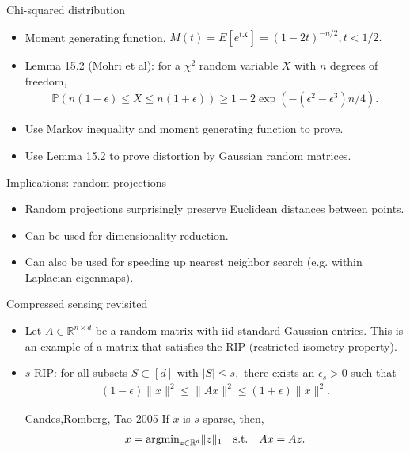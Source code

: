 \documentclass[final]{beamer}
\begin{document}
\begin{frame}{Chi-squared distribution}
	\begin{itemize}
		\item Moment generating function, $M(t) = E[e^{tX}] = (1-2t)^{-n/2}, t < 1/2.$
		\pause
	\item Lemma 15.2 (Mohri et al): for a $\chi^2$ random variable $X$ with $n$ degrees of freedom, 
	\begin{align}
		\mathbb{P}(n(1 - \epsilon)\leq X \leq n(1+\epsilon)) \geq 1 - 2\exp(-(\epsilon^2 - \epsilon^3) n/4).
	\end{align}
	\pause
\item Use Markov inequality and moment generating function to prove.
	\pause
	\item Use Lemma 15.2 to prove distortion by Gaussian random matrices.
	\end{itemize}
\end{frame}
\begin{frame}{Implications: random projections}
	\begin{itemize}
		\item Random projections surprisingly preserve Euclidean distances between points.
		\pause 
		\item Can be used for dimensionality reduction.
		\pause
		\item Can also be used for speeding up nearest neighbor search (e.g. within Laplacian eigenmaps).
		\pause
		
			
	\end{itemize}
\end{frame}
\begin{frame}{Compressed sensing revisited}
	\begin{itemize}
	\item Let $A \in \mathbb{R}^{n\times d}$ be a random matrix with iid standard Gaussian entries. This is an example of a matrix that satisfies the RIP (restricted isometry property).
	\pause 
	\item $s$-RIP: for all subsets $S \subset [d]$ with $|S| \leq s,$ there exists an $\epsilon_s > 0$ such that
		\begin{align}
		(1-\epsilon)\|x\|^2 \leq \|Ax\|^2 \leq (1+\epsilon)\|x\|^2.
	\end{align}
	\pause
	\item [Candes,Romberg, Tao 2005] If $x$ is $s$-sparse, then,
	\begin{align}
		x = {\rm argmin}_{z \in \mathbb{R}^d} \|z\|_1 \quad {\rm s.t.} \quad Ax = Az.
	\end{align}
	\end{itemize}
\end{frame}
\end{document}
